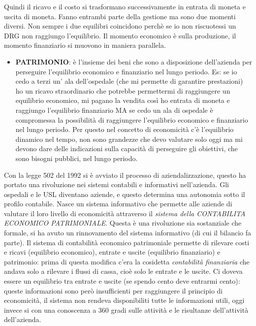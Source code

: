 Quindi il ricavo e il costo si trasformano successivamente in entrata di
moneta e uscita di moneta. Fanno entrambi parte della gestione ma sono
due momenti diversi. Non sempre i due equilibri coincidono perchè se io
non riscuotessi un DRG non raggiungo l'equilibrio. Il momento economico
è sulla produzione, il momento finanziario si muovono in maniera
parallela.

\begin{itemize}
\item
  \textbf{PATRIMONIO}: è l'insieme dei beni che sono a disposizione
  dell'azienda per perseguire l'equilibrio economico e finanziario nel
  lungo periodo. Es: se io cedo a terzi un' ala dell'ospedale (che mi
  permette di garantire prestazioni) ho un ricavo straordinario che
  potrebbe permettermi di raggiungere un equilibrio economico, mi pagano
  la vendita così ho entrata di moneta e raggiungo l'equilibrio
  finanziario MA se cedo un ala di ospedale è compromessa la possibilità
  di raggiungere l'equilibrio economico e finanziario nel lungo periodo.
  Per questo nel concetto di economicità c'è l'equilibrio dinamico nel
  tempo, non sono grandezze che devo valutare solo oggi ma mi devono
  dare delle indicazioni sulla capacità di perseguire gli obiettivi, che
  sono bisogni pubblici, nel lungo periodo.
\end{itemize}

Con la legge 502 del 1992 si è avviato il processo di aziendalizzazione,
questo ha portato una rivoluzione nei sistemi contabili e informativi
nell'azienda. Gli ospedali e le USL diventano aziende, e questo
determina una autonomia sotto il profilo contabile. Nasce un sistema
informativo che permette alle aziende di valutare il loro livello di
economicità attraverso il \emph{sistema della CONTABILITA ECONOMICO
PATRIMONIALE}. Questa è una rivoluzione sia sostanziale che formale, si
ha avuto un rinnovamento del sistema informativo (di cui il bilancio fa
parte). Il sistema di contabilità economico patrimoniale permette di
rilevare costi e ricavi (equilibrio economico), entrate e uscite
(equilibrio finanziario) e patrimonio: prima di questa modifica c'era la
cosidetta \emph{contabilità finanziaria} che andava solo a rilevare i
flussi di cassa, cioè solo le entrate e le uscite. Ci doveva essere un
equilibrio tra entrate e uscite (se spendo cento deve entrarmi cento):
queste informazioni sono però insufficienti per raggiungere il principio
di economicità, il sistema non rendeva disponibiliti tutte le
informazioni utili, oggi invece si con una conoscenza a 360 gradi sulle
attività e le risultanze dell'attività dell'azienda.

